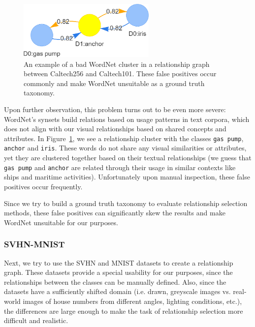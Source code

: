 \begin{figure}[H]
      \centering
      \includegraphics[width=0.6\textwidth]{figures/wordnet.png}

      \caption{An example of a bad WordNet cluster in a relationship graph between Caltech256 and Caltech101.
            These false positives occur commonly and make WordNet unsuitable as a ground truth taxonomy.}
      \label{fig:wordnet}
\end{figure}

Upon further observation, this problem turns out to be even more severe:
WordNet's synsets build relations based on usage patterns in text corpora,
which does not align with our visual relationships based on shared concepts and attributes.
In Figure~\ref{fig:wordnet}, we see a relationship cluster with the classes \texttt{gas pump}, \texttt{anchor} and \texttt{iris}.
These words do not share any visual similarities or attributes, yet they are clustered together based on their textual relationships
(we guess that \texttt{gas pump} and \texttt{anchor} are related through their usage in similar contexts like ships and maritime activities).
Unfortunately upon manual inspection, these false positives occur frequently.

Since we try to build a ground truth taxonomy to evaluate relationship selection methods,
these false positives can significantly skew the results and make WordNet unsuitable for our purposes.

\subsubsection{SVHN-MNIST}

Next, we try to use the SVHN and MNIST datasets to create a relationship graph.
These datasets provide a special usability for our purposes,
since the relationships between the classes can be manually defined.
Also, since the datasets have a sufficiently shifted domain (i.e. drawn, greyscale images vs. real-world images of house numbers
from different angles, lighting conditions, etc.),
the differences are large enough to make the task of relationship selection more difficult and realistic.

